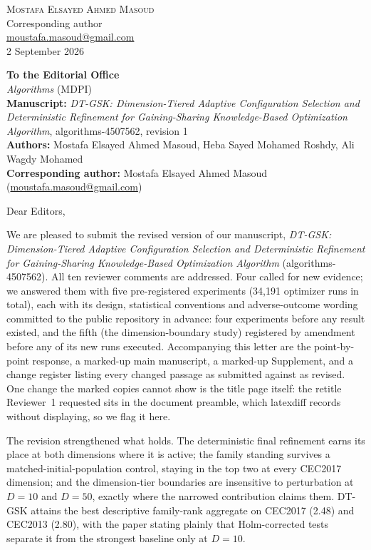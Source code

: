 \documentclass[11pt,a4paper]{article}
\newcommand{\dtgsk}{DT-GSK}
\begin{document}
\begin{flushright}
\textsc{Mostafa Elsayed Ahmed Masoud}\\
Corresponding author\\
\href{mailto:moustafa.masoud@gmail.com}{moustafa.masoud@gmail.com}\\
2 September 2026
\end{flushright}

\vspace{0.5em}

\textbf{To the Editorial Office}\\
\textit{Algorithms} (MDPI)\\[0.5em]

\textbf{Manuscript:} \textit{DT-GSK: Dimension-Tiered Adaptive Configuration Selection and Deterministic Refinement for Gaining-Sharing Knowledge-Based Optimization Algorithm}, algorithms-4507562, revision 1\\
\textbf{Authors:} Mostafa Elsayed Ahmed Masoud, Heba Sayed Mohamed Roshdy, Ali Wagdy Mohamed\\
\textbf{Corresponding author:} Mostafa Elsayed Ahmed Masoud \;(\href{mailto:moustafa.masoud@gmail.com}{moustafa.masoud@gmail.com})

\hrulefill

\vspace{0.5em}

Dear Editors,

We are pleased to submit the revised version of our manuscript, \textit{DT-GSK: Dimension-Tiered Adaptive Configuration Selection and Deterministic Refinement for Gaining-Sharing Knowledge-Based Optimization Algorithm} (algorithms-4507562). All ten reviewer comments are addressed. Four called for new evidence; we answered them with five pre-registered experiments (34,191 optimizer runs in total), each with its design, statistical conventions and adverse-outcome wording committed to the public repository in advance: four experiments before any result existed, and the fifth (the dimension-boundary study) registered by amendment before any of its new runs executed. Accompanying this letter are the point-by-point response, a marked-up main manuscript, a marked-up Supplement, and a change register listing every changed passage as submitted against as revised. One change the marked copies cannot show is the title page itself: the retitle Reviewer~1 requested sits in the document preamble, which latexdiff records without displaying, so we flag it here.

The revision strengthened what holds. The deterministic final refinement earns its place at both dimensions where it is active; the family standing survives a matched-initial-population control, staying in the top two at every CEC2017 dimension; and the dimension-tier boundaries are insensitive to perturbation at $D = 10$ and $D = 50$, exactly where the narrowed contribution claims them. \dtgsk{} attains the best descriptive family-rank aggregate on CEC2017 (2.48) and CEC2013 (2.80), with the paper stating plainly that Holm-corrected tests separate it from the strongest baseline only at $D = 10$.
\end{document}
